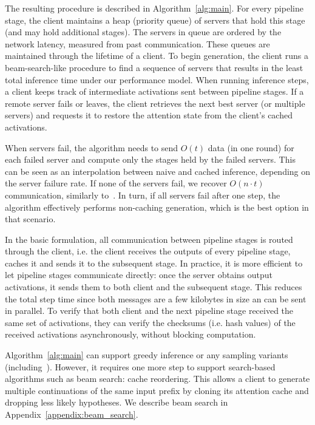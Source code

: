 The resulting procedure is described in Algorithm~\ref{alg:main}.
For every pipeline stage, the client maintains a heap (priority queue) of servers that hold this stage (and may hold additional stages). The servers in queue are ordered by the network latency, measured from past communication. These queues are maintained through the lifetime of a client. To begin generation, the client runs a beam-search-like procedure to find a sequence of servers that results in the least total inference time under our performance model. When running inference steps, a client keeps track of intermediate activations sent between pipeline stages. If a remote server fails or leaves, the client retrieves the next best server (or multiple servers) and requests it to restore the attention state from the client's cached activations.



When servers fail, the algorithm needs to send $O(t)$ data (in one round) for each failed server and compute only the stages held by the failed servers. This can be seen as an interpolation between naive and cached inference, depending on the server failure rate. If none of the servers fail, we recover $O(n \cdot t)$ communication, similarly to~\citet{ds_inference}. In turn, if all servers fail after one step, the algorithm effectively performs non-caching generation, which is the best option in that scenario.


In the basic formulation, all communication between pipeline stages is routed through the client, i.e. the client receives the outputs of every pipeline stage, caches it and sends it to the subsequent stage. In practice, it is more efficient to let pipeline stages communicate directly: once the server obtains output activations, it sends them to both client and the subsequent stage. This reduces the total step time since both messages are a few kilobytes in size an can be sent in parallel. To verify that both client and the next pipeline stage received the same set of activations, they can verify the checksums (i.e. hash values) of the received activations asynchronously, without blocking computation.

Algorithm~\ref{alg:main} can support greedy inference or any sampling variants (including~\citet{nucleus}). However, it requires one more step to support search-based algorithms such as beam search: cache reordering. This allows a client to generate multiple continuations of the same input prefix by cloning its attention cache and dropping less likely hypotheses. We describe beam search in Appendix~\ref{appendix:beam_search}.


